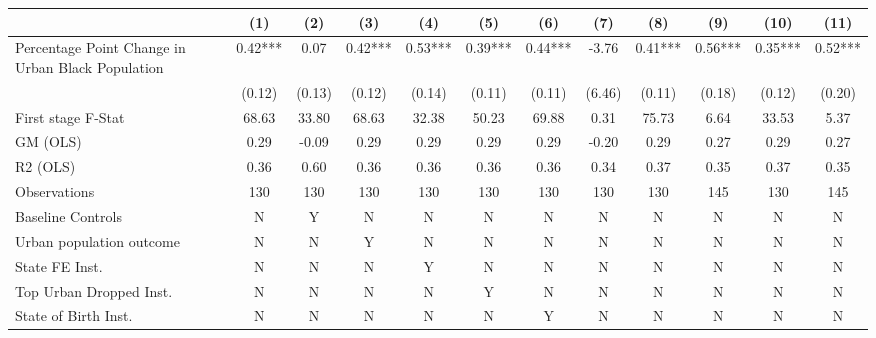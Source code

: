  \begin{tabular}{l*{11}{c}} \toprule
                    &\multicolumn{1}{c}{(1)}   &\multicolumn{1}{c}{(2)}   &\multicolumn{1}{c}{(3)}   &\multicolumn{1}{c}{(4)}   &\multicolumn{1}{c}{(5)}   &\multicolumn{1}{c}{(6)}   &\multicolumn{1}{c}{(7)}   &\multicolumn{1}{c}{(8)}   &\multicolumn{1}{c}{(9)}   &\multicolumn{1}{c}{(10)}   &\multicolumn{1}{c}{(11)}   \\
\midrule
Percentage Point Change in Urban Black Population&     0.42***&     0.07   &     0.42***&     0.53***&     0.39***&     0.44***&    -3.76   &     0.41***&     0.56***&     0.35***&     0.52***\\
                    &   (0.12)   &   (0.13)   &   (0.12)   &   (0.14)   &   (0.11)   &   (0.11)   &   (6.46)   &   (0.11)   &   (0.18)   &   (0.12)   &   (0.20)   \\
\midrule
First stage F-Stat  &    68.63   &    33.80   &    68.63   &    32.38   &    50.23   &    69.88   &     0.31   &    75.73   &     6.64   &    33.53   &     5.37   \\
GM (OLS)            &     0.29   &    -0.09   &     0.29   &     0.29   &     0.29   &     0.29   &    -0.20   &     0.29   &     0.27   &     0.29   &     0.27   \\
R2 (OLS)            &     0.36   &     0.60   &     0.36   &     0.36   &     0.36   &     0.36   &     0.34   &     0.37   &     0.35   &     0.37   &     0.35   \\
Observations        &      130   &      130   &      130   &      130   &      130   &      130   &      130   &      130   &      145   &      130   &      145   \\
Baseline Controls   &        N   &        Y   &        N   &        N   &        N   &        N   &        N   &        N   &        N   &        N   &        N   \\
Urban population outcome&        N   &        N   &        Y   &        N   &        N   &        N   &        N   &        N   &        N   &        N   &        N   \\
State FE Inst.      &        N   &        N   &        N   &        Y   &        N   &        N   &        N   &        N   &        N   &        N   &        N   \\
Top Urban Dropped Inst.&        N   &        N   &        N   &        N   &        Y   &        N   &        N   &        N   &        N   &        N   &        N   \\
State of Birth Inst.&        N   &        N   &        N   &        N   &        N   &        Y   &        N   &        N   &        N   &        N   &        N   \\

\end{tabular}
